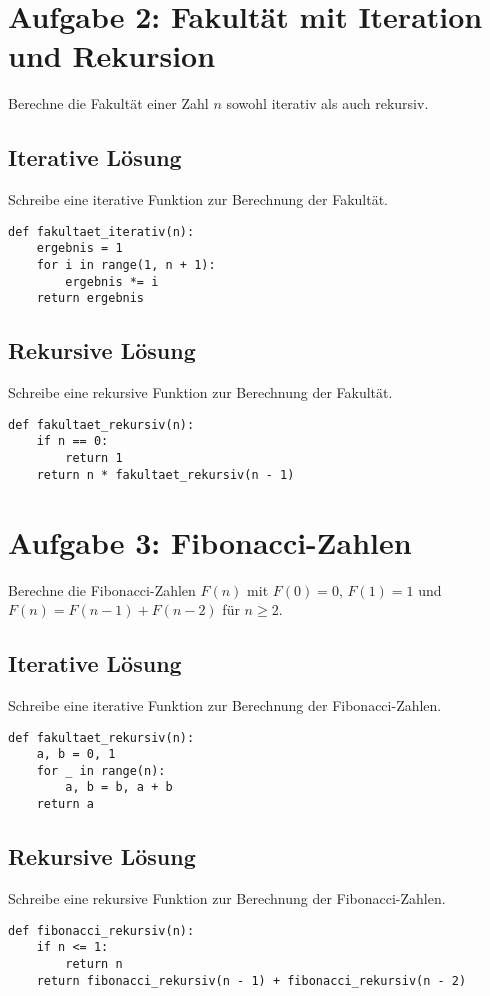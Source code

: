 \documentclass{article}
\begin{document}
\section*{Aufgabe 2: Fakultät mit Iteration und Rekursion}
Berechne die Fakultät einer Zahl $n$ sowohl iterativ als auch rekursiv.

\subsection*{Iterative Lösung}
Schreibe eine iterative Funktion zur Berechnung der Fakultät.

\begin{lstlisting}[style=pythonstyle]
def fakultaet_iterativ(n):
    ergebnis = 1
    for i in range(1, n + 1):
        ergebnis *= i
    return ergebnis
\end{lstlisting}

\subsection*{Rekursive Lösung}
Schreibe eine rekursive Funktion zur Berechnung der Fakultät.

\begin{lstlisting}[style=pythonstyle]
def fakultaet_rekursiv(n):
    if n == 0:
        return 1
    return n * fakultaet_rekursiv(n - 1)
\end{lstlisting}

\section*{Aufgabe 3: Fibonacci-Zahlen}
Berechne die Fibonacci-Zahlen $F(n)$ mit $F(0) = 0$, $F(1) = 1$ und $F(n) = F(n-1) + F(n-2)$ für $n \geq 2$.

\subsection*{Iterative Lösung}
Schreibe eine iterative Funktion zur Berechnung der Fibonacci-Zahlen.

\begin{lstlisting}[style=pythonstyle]
def fakultaet_rekursiv(n):
    a, b = 0, 1
    for _ in range(n):
        a, b = b, a + b
    return a
\end{lstlisting}

\subsection*{Rekursive Lösung}
Schreibe eine rekursive Funktion zur Berechnung der Fibonacci-Zahlen.

\begin{lstlisting}[style=pythonstyle]
def fibonacci_rekursiv(n):
    if n <= 1:
        return n
    return fibonacci_rekursiv(n - 1) + fibonacci_rekursiv(n - 2)
\end{lstlisting}
\end{document}
